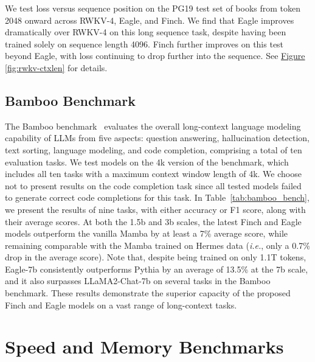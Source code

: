 We test loss versus sequence position on the PG19 \citep{raecompressive2019} test set of books from token 2048 onward across RWKV-4, Eagle, and Finch. We find that Eagle improves dramatically over RWKV-4 on this long sequence task, despite having been trained solely on sequence length 4096. Finch further improves on this test beyond Eagle, with loss continuing to drop further into the sequence. See \hyperref[fig:rwkv-ctxlen]{Figure \ref*{fig:rwkv-ctxlen}} for details.

\subsection{Bamboo Benchmark} \label{subsec:bamboo}
The Bamboo benchmark~\citep{dong2023bamboo} evaluates the overall long-context language modeling capability of LLMs from five aspects: question answering, hallucination detection, text sorting, language modeling, and code completion, comprising a total of ten evaluation tasks. We test models on the 4k version of the benchmark, which includes all ten tasks with a maximum context window length of 4k. We choose not to present results on the code completion task since all tested models failed to generate correct code completions for this task. In Table~\ref{tab:bamboo_bench}, we present the results of nine tasks, with either accuracy or F1 score, along with their average scores. At both the 1.5b and 3b scales, the latest Finch and Eagle models outperform the vanilla Mamba by at least a 7\% average score, while remaining comparable with the Mamba trained on Hermes data (\textit{i.e.}, only a 0.7\% drop in the average score). Note that, despite being trained on only 1.1T tokens, Eagle-7b consistently outperforms Pythia by an average of 13.5\% at the 7b scale, and it also surpasses LLaMA2-Chat-7b on several tasks in the Bamboo benchmark. These results demonstrate the superior capacity of the proposed Finch and Eagle models on a vast range of long-context tasks.

\section{Speed and Memory Benchmarks}
\label{sec:Speed and Memory Benchmarks}

